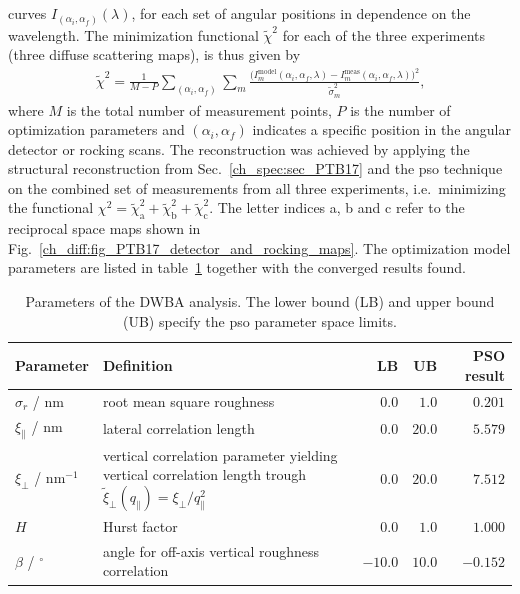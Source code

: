 curves $I_{(\alpha_i, \alpha_f)}(\lambda)$, for each set of angular positions in dependence on the wavelength. The minimization functional $\tilde{\chi}^2$ for each of the three experiments (three diffuse scattering maps), is thus given by
\begin{align}
 \tilde{\chi}^2 = \frac{1}{M-P} \sum\limits_{(\alpha_i, \alpha_f)} \sum\limits_{m} \frac{\big(I_m^\text{model}(\alpha_i, \alpha_f, \lambda)
- I_m^\text{meas}(\alpha_i, \alpha_f, \lambda)\big)^2}{\tilde{\sigma}_m^2} \text{,} \label{ch_diff:eqn_chi_diffuse}
\end{align}
where $M$ is the total number of measurement points, $P$ is the number of optimization parameters and $(\alpha_i, \alpha_f)$ indicates a specific position in the angular detector or rocking scans. The reconstruction was achieved by applying the structural reconstruction from Sec.~\ref{ch_spec:sec_PTB17} and the \gls{pso} technique on the combined set of measurements from all three experiments, i.e.~minimizing the functional $\chi^2 = \tilde{\chi}^2_\text{a} + \tilde{\chi}^2_\text{b} + \tilde{\chi}^2_\text{c}$. The letter indices a, b and c refer to the reciprocal space maps shown in Fig.~\ref{ch_diff:fig_PTB17_detector_and_rocking_maps}. The optimization model parameters are listed in table~\ref{ch_diff:tbl_PTB17_diffuse_optimization_limits_and_results} together with the converged results found.
\begin{table}
\centering
\caption{Parameters of the DWBA analysis. The lower bound (LB) and upper bound (UB) specify the \gls{pso} parameter space limits.}
\label{ch_diff:tbl_PTB17_diffuse_optimization_limits_and_results}
\begin{tabularx}{\textwidth}{@{}lXrrr@{}}
\toprule
Parameter & Definition & LB & UB & PSO result\\ \midrule
$\sigma_r$ / nm & root mean square roughness & $0.0$& $1.0$ & $0.201$\\ 
$\xi_\parallel$ / nm & lateral correlation length & $0.0$& $20.0$ & $5.579$\\ 
$\xi_\perp$ / nm$^{-1}$ &vertical correlation parameter yielding vertical correlation length trough $\tilde{\xi}_\perp(q_\parallel) = \xi_\perp/q_\parallel^2$ &$0.0$ & $20.0$ & $7.512$\\
$H$ & Hurst factor & $0.0$ & $1.0$ & $1.000$ \\
$\beta$ / $^\circ$&angle for off-axis vertical roughness correlation& $-10.0$ & $10.0$ & $-0.152$\\ 
 \bottomrule
\end{tabularx}
\end{table}
